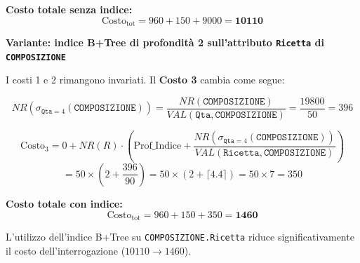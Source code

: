 \bigskip
\noindent\textbf{Costo totale senza indice:}
\[
\text{Costo}_{\text{tot}} = 960 + 150 + 9000 = \mathbf{10110}
\]

\bigskip
\noindent\textbf{Variante: indice B+Tree di profondità 2 sull'attributo \texttt{Ricetta} di \texttt{COMPOSIZIONE}}

\noindent I costi 1 e 2 rimangono invariati. Il \textbf{Costo 3} cambia come segue:

\[
NR(\sigma_{\texttt{Qta}=4}(\texttt{COMPOSIZIONE}))
= \frac{NR(\texttt{COMPOSIZIONE})}{VAL(\texttt{Qta}, \texttt{COMPOSIZIONE})}
= \frac{19800}{50} = 396
\]

\[
\text{Costo}_3 = 0 + NR(R) \cdot \left(\text{Prof\_Indice} +
\frac{NR(\sigma_{\texttt{Qta}=4}(\texttt{COMPOSIZIONE}))}{VAL(\texttt{Ricetta},
	\texttt{COMPOSIZIONE})}\right)
\]
\[
= 50 \times \left(2 + \frac{396}{90}\right)
= 50 \times (2 + \lceil 4.4 \rceil)
= 50 \times 7 = 350
\]

\bigskip
\noindent\textbf{Costo totale con indice:}
\[
\text{Costo}_{\text{tot}} = 960 + 150 + 350 = \mathbf{1460}
\]

\noindent L'utilizzo dell'indice B+Tree su \texttt{COMPOSIZIONE.Ricetta} riduce significativamente
il costo dell'interrogazione ($10110 \rightarrow 1460$).